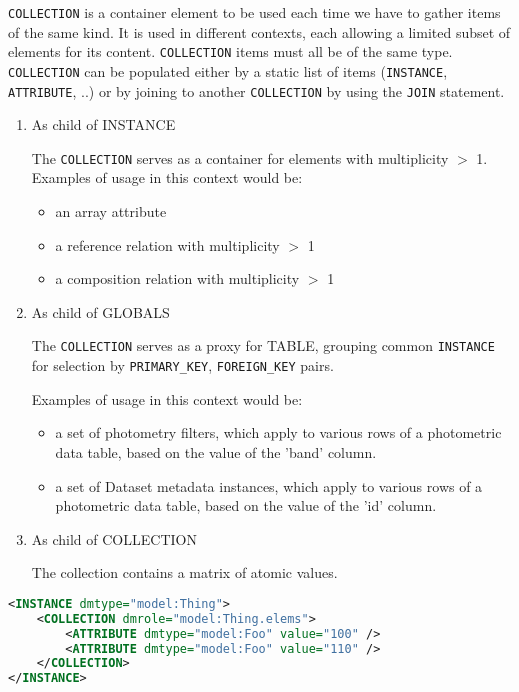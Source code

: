     \texttt{COLLECTION} is a container element to be used each time we have to gather items of the same kind.  It is used in different contexts, each allowing a limited subset of elements for its content. 
     \texttt{COLLECTION} items must all be of the same type.
    \texttt{COLLECTION} can be populated either by a static list of items (\texttt{INSTANCE}, \texttt{ATTRIBUTE}, ..) or by joining to another \texttt{COLLECTION} by using the \texttt{JOIN} statement.    
    
    \begin{enumerate}
    \item{As child of INSTANCE}
      
      The \texttt{COLLECTION} serves as a container for elements with multiplicity $>$ 1.\\
      Examples of usage in this context would be:
      \begin{itemize}
        \item an array attribute
        \item a reference relation with multiplicity $>$ 1
        \item a composition relation with multiplicity $>$ 1
      \end{itemize}
      
    \item{As child of GLOBALS}
          
      The \texttt{COLLECTION} serves as a proxy for TABLE, grouping common \texttt{INSTANCE}  for selection by \texttt{PRIMARY\_KEY}, \texttt{FOREIGN\_KEY} pairs.
      
      Examples of usage in this context would be:
      \begin{itemize}
        \item a set of photometry filters, which apply to various rows of a photometric data table, based on the value of the 'band' column.
        \item a set of Dataset metadata instances, which apply to various rows of a photometric data table, based on the value of the 'id' column.
      \end{itemize}
          
    \item{As child of COLLECTION}
    
	The collection contains a matrix of  atomic values.
        
    \end{enumerate}
   
\begin{lstlisting}[caption={Example of a \texttt{COLLECTION} child of \texttt{INSTANCE}. It must have a role as an enclosing \texttt{INSTANCE} component.},language=XML]
<INSTANCE dmtype="model:Thing">
    <COLLECTION dmrole="model:Thing.elems">
        <ATTRIBUTE dmtype="model:Foo" value="100" />
        <ATTRIBUTE dmtype="model:Foo" value="110" />
    </COLLECTION>
</INSTANCE>
\end{lstlisting}   

